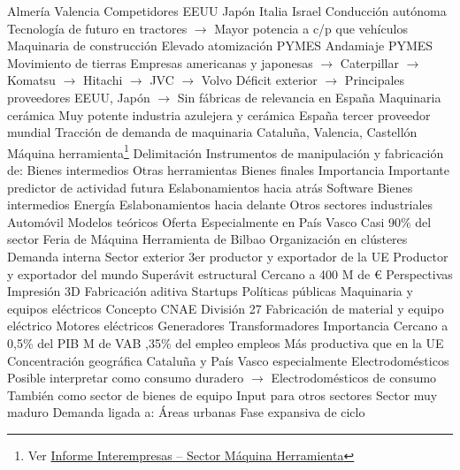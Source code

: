 \documentclass{nuevotema}
\begin{document}
\begin{esquemal}
				\4[] Almería
				\4[] Valencia
				\4 Competidores
				\4[] EEUU
				\4[] Japón
				\4[] Italia
				\4[] Israel
				\4 Conducción autónoma
				\4[] Tecnología de futuro en tractores
				\4[] $\to$ Mayor potencia a c/p que vehículos
			\3 Maquinaria de construcción
				\4 Elevado atomización
				\4[] PYMES
				\4 Andamiaje
				\4[] PYMES
				\4 Movimiento de tierras
				\4[] Empresas americanas y japonesas
				\4[] $\to$ Caterpillar
				\4[] $\to$ Komatsu
				\4[] $\to$ Hitachi
				\4[] $\to$ JVC
				\4[] $\to$ Volvo
				\4[] Déficit exterior
				\4[] $\to$ Principales proveedores EEUU, Japón
				\4[] $\to$ Sin fábricas de relevancia en España
			\3 Maquinaria cerámica
				\4 Muy potente industria azulejera y cerámica
				\4 España tercer proveedor mundial
				\4 Tracción de demanda de maquinaria
				\4 Cataluña, Valencia, Castellón
		\2 Máquina herramienta\footnote{Ver \href{http://www.interempresas.net/Flipbooks/IM/2018/pdf/IM3.pdf}{Informe Interempresas -- Sector Máquina Herramienta}}
			\3 Delimitación
				\4 Instrumentos de manipulación y fabricación de:
				\4[] Bienes intermedios
				\4[] Otras herramientas
				\4[] Bienes finales
			\3 Importancia
				\4 Importante predictor de actividad futura
				\4 Eslabonamientos hacia atrás
				\4[] Software
				\4[] Bienes intermedios
				\4[] Energía
				\4 Eslabonamientos hacia delante
				\4[] Otros sectores industriales
				\4[] Automóvil
			\3 Modelos teóricos
			\3 Oferta
				\4 Especialmente en País Vasco
				\4[] Casi 90\% del sector
				\4 Feria de Máquina Herramienta de Bilbao
				\4 Organización en clústeres
			\3 Demanda interna
			\3 Sector exterior
				\4 3er productor y exportador de la UE
				 Productor y exportador del mundo
				\4 Superávit estructural
				\4[] Cercano a 400 M de €
			\3 Perspectivas
				\4 Impresión 3D
				\4 Fabricación aditiva
				\4 Startups
			\3 Políticas públicas
		\2 Maquinaria y equipos eléctricos
			\3 Concepto
				\4 CNAE División 27
				\4[] Fabricación de material y equipo eléctrico
				\4 Motores eléctricos
				\4 Generadores
				\4 Transformadores
			\3 Importancia
				\4 Cercano a 0,5\% del PIB
				 M de VAB
				,35\% del empleo
				 empleos
				\4 Más productiva que en la UE
			\3 Concentración geográfica
				\4 Cataluña y País Vasco especialmente
			\3 Electrodomésticos
				\4 Posible interpretar como consumo duradero
				\4[] $\to$ Electrodomésticos de consumo
				\4 También como sector de bienes de equipo
				\4[] Input para otros sectores
				\4 Sector muy maduro
				\4 Demanda ligada a:
				\4[] Áreas urbanas
				\4[] Fase expansiva de ciclo

\end{esquemal}
\end{document}

